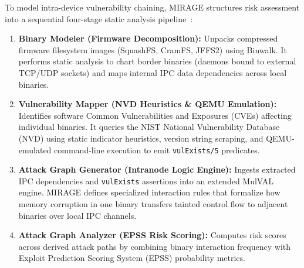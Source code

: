 \documentclass[target=mst,aauheader=aics,style=]{thud}
\begin{document}
To model intra-device vulnerability chaining, MIRAGE structures risk assessment into a sequential four-stage static analysis pipeline~\cite{TayouriMIRAGE}:
\begin{enumerate}
    \item \textbf{Binary Modeler (Firmware Decomposition):} Unpacks compressed firmware filesystem images (SquashFS, CramFS, JFFS2) using Binwalk. It performs static analysis to chart border binaries (daemons bound to external TCP/UDP sockets) and maps internal IPC data dependencies across local binaries.
    \item \textbf{Vulnerability Mapper (NVD Heuristics \& QEMU Emulation):} Identifies software Common Vulnerabilities and Exposures (CVEs) affecting individual binaries. It queries the NIST National Vulnerability Database (NVD) using static indicator heuristics, version string scraping, and QEMU-emulated command-line execution to emit \texttt{vulExists/5} predicates.
    \item \textbf{Attack Graph Generator (Intranode Logic Engine):} Ingests extracted IPC dependencies and \texttt{vulExists} assertions into an extended MulVAL engine. MIRAGE defines specialized interaction rules that formalize how memory corruption in one binary transfers tainted control flow to adjacent binaries over local IPC channels.
    \item \textbf{Attack Graph Analyzer (EPSS Risk Scoring):} Computes risk scores across derived attack paths by combining binary interaction frequency with Exploit Prediction Scoring System (EPSS) probability metrics.
\end{enumerate}
\end{document}
